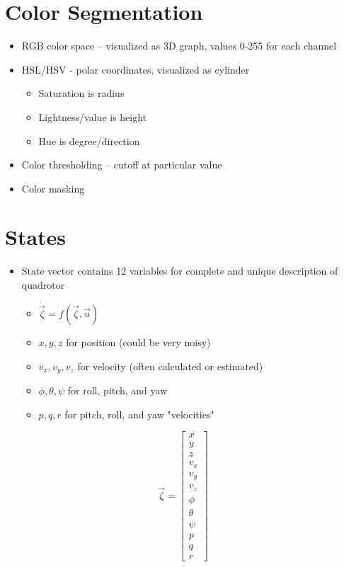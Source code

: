 \documentclass{article}
\begin{document}
\section*{Color Segmentation}
\begin{itemize}
\item RGB color space – visualized as 3D graph, values 0-255 for each channel 
\item HSL/HSV - polar coordinates, visualized as cylinder
\begin{itemize}
\item Saturation is radius 
\item Lightness/value is height 
\item Hue is degree/direction 
\end{itemize}
\item  Color thresholding – cutoff at particular value 
\item Color masking 
\end{itemize}
\section*{States}
\begin{itemize}
\item State vector contains 12 variables for complete and unique description of quadrotor
    \begin{itemize}
    \item $\dot{\vec{\zeta}}=f(\vec{\zeta},\vec{u})$
      \item $x, y, z$ for position (could be very noisy)
      \item $v_x, v_y, v_z$ for velocity (often calculated or estimated)
      \item $\phi, \theta, \psi$ for roll, pitch, and yaw
      \item $p, q, r$ for pitch, roll, and yaw "velocities"
    \end{itemize}
\end{itemize}

\begin{equation*}
\vec{\zeta}=
\begin{bmatrix}
x\\y\\z\\v_x\\v_y\\v_z\\\phi\\\theta\\\psi\\p\\q\\r
\end{bmatrix}
\end{equation*}
\end{document}
